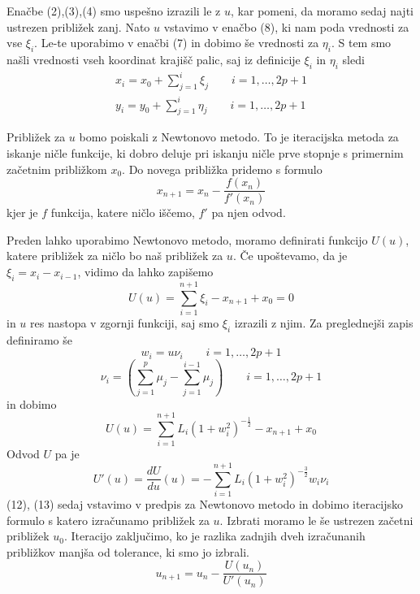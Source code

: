 \documentclass[A4paper, 11pt]{article}
\begin{document}
Enačbe (2),(3),(4) smo uspešno izrazili le z $u$, kar pomeni, da moramo sedaj najti ustrezen približek zanj. Nato $u$ vstavimo v enačbo (8), ki nam poda vrednosti za vse $\xi_i$. Le-te uporabimo v enačbi (7) in dobimo še vrednosti za $\eta_i$. S tem smo našli vrednosti vseh koordinat krajišč palic, saj iz definicije $\xi_i$ in $\eta_i$ sledi 
\begin{equation}
\begin{split}
x_i = x_0 + \sum_{j=1}^{i} \xi_j \qquad i = 1, \ldots, 2p+1 \\
y_i = y_0 + \sum_{j=1}^{i} \eta_j \qquad i = 1, \ldots, 2p+1
\end{split}
\end{equation}

Približek za $u$ bomo poiskali z Newtonovo metodo. To je iteracijska metoda za iskanje ničle funkcije, ki dobro deluje pri iskanju ničle prve stopnje s primernim začetnim približkom $x_0$. Do novega približka pridemo s formulo
\[ x_{n+1} = x_n - \frac{f(x_n)}{f'(x_n)} \]
kjer je $f$ funkcija, katere ničlo iščemo, $f'$ pa njen odvod. 

Preden lahko uporabimo Newtonovo metodo, moramo definirati funkcijo $U(u)$, katere približek za ničlo bo naš približek za $u$.
Če upoštevamo, da je $\xi_i = x_i - x_{i-1}$, vidimo da lahko zapišemo
\[ U(u) = \sum_{i=1}^{n+1} \xi_i - x_{n+1} + x_0 = 0 \]
in $u$ res nastopa v zgornji funkciji, saj smo $\xi_i$ izrazili z njim. Za preglednejši zapis definiramo še 
\begin{equation}
w_i = u \nu_i \qquad i=1, \ldots, 2p+1
\end{equation}
\begin{equation}
\nu_i = \left ( \sum_{j=1}^{p} \mu_j - \sum_{j=1}^{i-1} \mu_j \right ) \qquad i=1, \ldots, 2p+1
\end{equation}
in dobimo
\begin{equation}
U(u) =  \sum_{i=1}^{n+1} L_i (1 + w_i ^2) ^ {-\frac{1}{2}} - x_{n+1} + x_0
\end{equation}
Odvod $U$ pa je
\begin{equation}
U'(u) = \frac{dU}{du} (u) = - \sum_{i=1}^{n+1} L_i (1 + w_i ^2) ^ {-\frac{3}{2}} w_i \nu_i 
\end{equation}
(12), (13) sedaj vstavimo v predpis za Newtonovo metodo in dobimo iteracijsko formulo s katero izračunamo približek za $u$. Izbrati moramo le še ustrezen začetni približek $u_0$. Iteracijo zaključimo, ko je razlika zadnjih dveh izračunanih približkov manjša od tolerance, ki smo jo izbrali.
\[ u_{n+1} = u_n - \frac{U(u_n)}{U'(u_n)} \]
\end{document}
